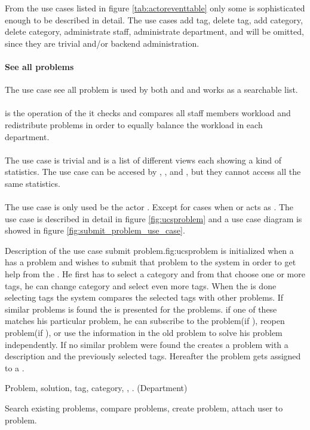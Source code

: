 From the use cases listed in figure \ref{tab:actoreventtable} only some is sophisticated enough to be described in detail.  
The use cases add tag, delete tag, add category, delete category, administrate staff, administrate department, and \gstat[] will be omitted, since they are trivial and/or backend administration. 

\paragraph{See all problems} The use case see all problem is used by both \aclient{} and \astaff{} and works as a searchable list. 

\paragraph{\bloadwork[c]} \bloadwork[c] is the operation of the \wmon{} it checks and compares all staff members workload and redistribute problems in order to equally balance the workload in each department. 

\paragraph{\gstat[c]} The use case \gstat[] is trivial and is a list of different views each showing a kind of statistics. The use case can be accesed by \sadmin{}, \aclient{}, and \astaff{}, but they cannot access all the same statistics.

\paragraph{\ucsproblem[c]} The use case \ucsproblem[] is only used be the actor \aclient. Except for cases when \astaff{} or \sadmin{}  acts as \aclient{}. The use case is described in detail in figure \ref{fig:ucsproblem} and a use case diagram is showed in figure \ref{fig:submit_problem_use_case}. 


\begin{sadlist}[h]{\ucsproblem[c]}{Description of the use case submit problem.}{fig:ucsproblem}
 \ucsproblem[c] is initialized when a \aclient{} has a problem and wishes to submit that problem to the system in order to get help from the \astaff{}. 
He first has to select a category and from that choose one or more tags, he can change category and select even more tags. 
When the \aclient{} is done selecting tags the system compares the selected tags with other problems. 
If similar problems is found the \aclient{} is presented for the problems.
if one of these matches his particular problem, he can subscribe to the problem(if \open), reopen problem(if \closed{}), or use the information in the old problem to solve his problem independently. 
If no similar problem were found the \aclient{} creates a problem with a description and the previously selected tags. 
Hereafter the problem gets assigned to a \astaff{}. 

 Problem, solution, tag, category, \client, \staff. (Department)

 Search existing problems, compare problems, create problem, attach user to problem.
\end{sadlist}

